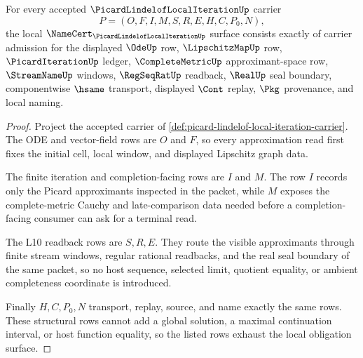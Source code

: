 \begin{theorem}
\label{thm:picard-lindelof-local-iteration-obligation-surface}
For every accepted $\PicardLindelofLocalIterationUp$ carrier
$$
P=(O,F,I,M,S,R,E,H,C,P_0,N),
$$
the local $\NameCert_{\PicardLindelofLocalIterationUp}$ surface consists exactly of carrier admission for the displayed $\OdeUp$ row, $\LipschitzMapUp$ row, $\PicardIterationUp$ ledger, $\CompleteMetricUp$ approximant-space row, $\StreamNameUp$ windows, $\RegSeqRatUp$ readback, $\RealUp$ seal boundary, componentwise $\hsame$ transport, displayed $\Cont$ replay, $\Pkg$ provenance, and local naming.
\end{theorem}
\begin{proof}
Project the accepted carrier of \autoref{def:picard-lindelof-local-iteration-carrier}. The ODE and vector-field rows are $O$ and $F$, so every approximation read first fixes the initial cell, local window, and displayed Lipschitz graph data.

The finite iteration and completion-facing rows are $I$ and $M$. The row $I$ records only the Picard approximants inspected in the packet, while $M$ exposes the complete-metric Cauchy and late-comparison data needed before a completion-facing consumer can ask for a terminal read.

The L10 readback rows are $S,R,E$. They route the visible approximants through finite stream windows, regular rational readbacks, and the real seal boundary of the same packet, so no host sequence, selected limit, quotient equality, or ambient completeness coordinate is introduced.

Finally $H,C,P_0,N$ transport, replay, source, and name exactly the same rows. These structural rows cannot add a global solution, a maximal continuation interval, or host function equality, so the listed rows exhaust the local obligation surface.
\end{proof}

